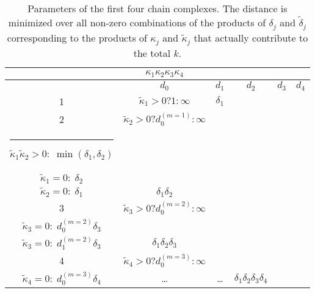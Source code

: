 \documentclass[aps,prb,12pt,tightenlines,%
notitlepage,longbibliography]{revtex4-1}
\begin{document}
\begin{turnpage}
\begin{table}[htbp]
\begin{tabular}[c]{c||c|c|c|c|c}
\begin{minipage}[c]{1.5in}
            \end{minipage} & ${\kappa}_1{\kappa}_2{\kappa}_3{\kappa}_4$
\\ \hline\hline 
    & $d_0$ & $d_1$ & $d_2$ & $d_3$ & $d_4$ \\ \hline 
1 & $\tilde{\kappa}_1>0? 1:\infty$ & $\delta_1$ & & &  \\ \hline 
2 & $\tilde{\kappa}_2>0? d_0^{(m=1)}:\infty$
                                 &   \begin{minipage}[c]{2.5in}
                   $\tilde{\kappa}_2>0?
                   \min\biglb(d_1^{(1)},d_0^{(1)}\delta_2\bigrb):d_0^{(1)}\delta_2
                   {}_{\strut}^{\strut}$\\
                   \hrule{\hfill}                 
                   $\tilde{\kappa}_1\tilde{\kappa}_2>0:  \;  
                   \min({\delta}_1,\delta_2)$\hfill\strut\\
                   $\tilde{\kappa}_1=0:  \;
                   \delta_2$\hfill\strut\\
                   $\tilde{\kappa}_2=0:  \;
                   \delta_1$\hfill\strut
                 \end{minipage}
    & $\delta_1\delta_2$ &  \\ \hline 
    3&  $\tilde{\kappa}_3>0? d_0^{(m=2)}:\infty$ &   \begin{minipage}[c]{2.2in}
                   $\tilde{\kappa}_3>0:  \;  
                   \min(d_1^{(m=2)},d_0^{(m=2)}\delta_3)$\hfill\strut\\
                   $\tilde{\kappa}_3=0:  \;
                   d_0^{(m=2)}\delta_3$\hfill\strut
                 \end{minipage} 
    &   \begin{minipage}[c]{2.1in}
      $\tilde{\kappa}_3>0:  \;  
      \min(d_2^{(m=2)},d_1^{(m=2)}\delta_3)$\hfill\strut\\
      $\tilde{\kappa}_3=0:  \;
      d_1^{(m=2)}\delta_3$\hfill\strut
    \end{minipage} & $\delta_1\delta_2\delta_3$
\\ \hline 
    4 & $\tilde{\kappa}_4>0? d_0^{(m=3)}:\infty$ &  \begin{minipage}[c]{2.1in}
      $\tilde{\kappa}_4>0:  \;  
      \min(d_1^{(m=3)},d_0^{(m=3)}\delta_4)$\hfill\strut\\
      $\tilde{\kappa}_4=0:  \;
      d_0^{(m=3)}\delta_4$\hfill\strut
    \end{minipage} & \ldots & \ldots & $\delta_1\delta_2\delta_3\delta_4$
  \end{tabular}
  \caption{Parameters of the first four chain complexes.  The distance
    is minimized over all
    non-zero combinations of the products of $\delta_j$ and
    $\tilde{\delta}_j$ corresponding to the products of $\kappa_j$ and $\tilde{\kappa}_j$
    that actually contribute to the total $k$.}
  \label{tab:params}
\end{table}
\end{turnpage}


\end{document}
